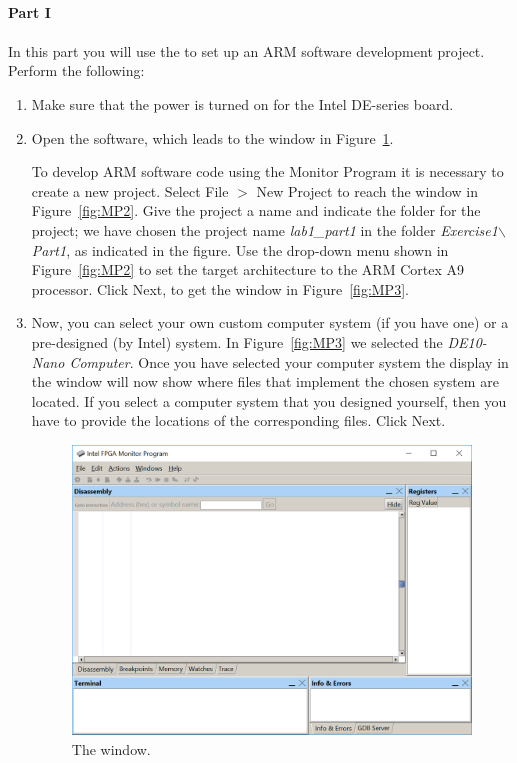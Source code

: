 \documentclass[epsfig,10pt,fullpage]{article}
\begin{document}
~\\
\noindent
{\bf Part I}
~\\
~\\
\noindent
In this part you will use the \productNameMed{} to set up an ARM software development
project.  Perform the following:
\begin{enumerate}
\item Make sure that the power is turned on for the Intel DE-series board.
\item Open the \productNameMed{} software, which leads to the window in Figure~\ref{fig:MP1}.

\noindent
To develop ARM software code using the Monitor Program it is necessary to create a new project.
Select {\sf File $>$ New Project} to reach the window in Figure~\ref{fig:MP2}.
Give the project a name and indicate the folder for the project; 
we have chosen the project name {\it lab1\_part1} in the folder {\it
Exercise1$\backslash$Part1},
as indicated in the figure. Use the drop-down menu shown in Figure~\ref{fig:MP2} to set
the target architecture to the ARM Cortex A9 processor.
Click {\sf Next}, to get the window in Figure~\ref{fig:MP3}.

\item Now, you can select your own custom computer system (if you have one) or a 
pre-designed (by Intel) system. In Figure~\ref{fig:MP3} we selected the {\it DE10-Nano Computer}. 
Once you have selected your computer system the display in the window will now show where 
files that implement the chosen system are located.  If you select a computer system that 
you designed yourself, then you have to provide the locations of the corresponding files. 
Click {\sf Next}.

\begin{figure}[H]
	\begin{center}
	\includegraphics[scale=.67]{figures/figureMP1.png}
	\end{center}
	\caption{The \productNameMed{} window.}
\label{fig:MP1}
\end{figure}


\end{enumerate}
\end{document}

